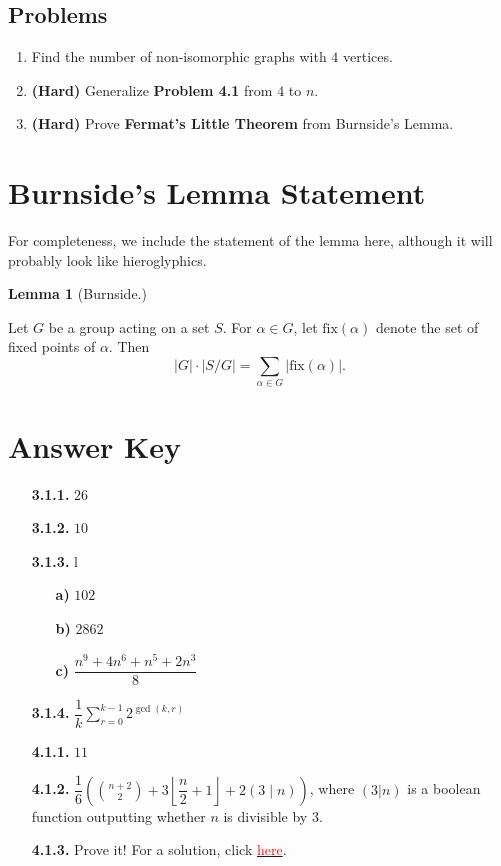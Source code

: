 \documentclass[11pt]{scrartcl}
\begin{document}
\subsection{Problems}
\begin{enumerate}
    \item Find the number of non-isomorphic graphs with $4$ vertices.
    \item \textbf{(Hard)} Generalize \color{red} \textbf{Problem 4.1} \color{black} from $4$ to $n$.
    \item \textbf{(Hard)} Prove \color{blue} \textbf{Fermat's Little Theorem} \color{black} from Burnside's Lemma.
\end{enumerate}

\section{Burnside's Lemma Statement}

For completeness, we include the statement of the lemma here, although it will probably look like hieroglyphics.

\begin{tcolorbox}[colback=orange!5!white,colframe=orange!75!black]
  \color{orange} \textbf{Lemma 1} (Burnside.)\color{black}
  \vspace{0.1cm}
  
  Let $G$ be a group acting on a set $S$. For $\alpha \in G$, let $\text{fix}(\alpha)$ denote the set of fixed points of $\alpha$. Then\[\lvert G \rvert \cdot \lvert S/G \rvert = \sum_{\alpha \in G} \lvert \text{fix}(\alpha) \rvert .\]
\end{tcolorbox}

\newpage

\section{Answer Key}

\begin{enumerate}
    \item[\textbf{3.1.1.}] $26$
    \item[\textbf{3.1.2.}] $10$
    \item[\textbf{3.1.3.}] \color{white} l \color{black}
    \begin{enumerate}
    \item[\textbf{a)}] $102$
    \item[\textbf{b)}] $2862$
    \item[\textbf{c)}] $\dfrac{n^9+4n^6+n^5+2n^3}{8}$
    \end{enumerate}
    \item[\textbf{3.1.4.}] $\dfrac{1}{k}\displaystyle\sum_{r=0}^{k-1}2^{\gcd(k,r)}$
    \item[\textbf{4.1.1.}] $11$
    \item[\textbf{4.1.2.}] $\dfrac{1}{6}\left(\displaystyle\binom{n+2}{2}+3\left\lfloor{\dfrac{n}{2}+1}\right\rfloor+2(3 \mid n)\right)$, where $(3|n)$ is a boolean function outputting whether $n$ is divisible by $3$.
    \item[\textbf{4.1.3.}] Prove it! For a solution, click \href{https://math.stackexchange.com/a/16631}{\textcolor{red}{here}}.
\end{enumerate}
\end{document}
